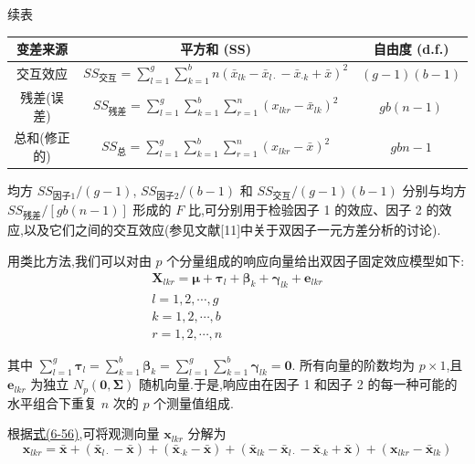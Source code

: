 \noindent\hfill{续表}\par
\begin{mvtable}
\begin{tabular}{@{}ccc@{}}
\toprule
变差来源 & 平方和 (SS) & 自由度 (d.f.)\\
\midrule
交互效应 & $SS_{交互}=\sum\limits_{l=1}^{g}\sum\limits_{k=1}^{b} n(\bar{x}_{lk}-\bar{x}_{l\cdot}-\bar{x}_{\cdot k}+\bar{x})^2$ & $(g-1)(b-1)$\\[10pt]
残差(误差) & $SS_{残差}=\sum\limits_{l=1}^{g}\sum\limits_{k=1}^{b}\sum\limits_{r=1}^{n}(x_{lkr}-\bar{x}_{lk})^2$ & $gb(n-1)$\\[10pt]
总和(修正的) & $SS_{总}=\sum\limits_{l=1}^{g}\sum\limits_{k=1}^{b}\sum\limits_{r=1}^{n}(x_{lkr}-\bar{x})^2$ & $gbn-1$\\
\bottomrule
\end{tabular}
\end{mvtable}

均方 $SS_{因子1}/(g-1)$, $SS_{因子2}/(b-1)$ 和 $SS_{交互}/(g-1)(b-1)$ 分别与均方 $SS_{残差}/[gb(n-1)]$ 形成的 $F$ 比,可分别用于检验因子 1 的效应、因子 2 的效应,以及它们之间的交互效应(参见文献[11]中关于双因子一元方差分析的讨论).


用类比方法,我们可以对由 $p$ 个分量组成的响应向量给出双因子固定效应模型如下:
\label{eq:6-59}
\begin{equation}
\begin{gathered}
\mathbf{X}_{lkr} = \boldsymbol{\mu} + \boldsymbol{\tau}_l + \boldsymbol{\beta}_k + \boldsymbol{\gamma}_{lk} + \mathbf{e}_{lkr}\\
l=1,2,\cdots,g\\
k=1,2,\cdots,b\\
r=1,2,\cdots,n
\end{gathered}
\tag{6-59}
\end{equation}

其中 $\sum\limits_{l=1}^{g}\boldsymbol{\tau}_l = \sum\limits_{k=1}^{b}\boldsymbol{\beta}_k = \sum\limits_{l=1}^{g}\sum\limits_{k=1}^{b}\boldsymbol{\gamma}_{lk} = \mathbf{0}$. 所有向量的阶数均为 $p\times 1$,且 $\mathbf{e}_{lkr}$ 为独立 $N_p(\mathbf{0},\boldsymbol{\Sigma})$ 随机向量.于是,响应由在因子 1 和因子 2 的每一种可能的水平组合下重复 $n$ 次的 $p$ 个测量值组成.

根据\hyperref[eq:6-56]{式(6-56)},可将观测向量 $\mathbf{x}_{lkr}$ 分解为
\label{eq:6-60}
\begin{equation}
\mathbf{x}_{lkr} = \bar{\mathbf{x}} + (\bar{\mathbf{x}}_{l\cdot}-\bar{\mathbf{x}}) + (\bar{\mathbf{x}}_{\cdot k}-\bar{\mathbf{x}}) + (\bar{\mathbf{x}}_{lk}-\bar{\mathbf{x}}_{l\cdot}-\bar{\mathbf{x}}_{\cdot k}+\bar{\mathbf{x}}) + (\mathbf{x}_{lkr}-\bar{\mathbf{x}}_{lk}) \tag{6-60}
\end{equation}

